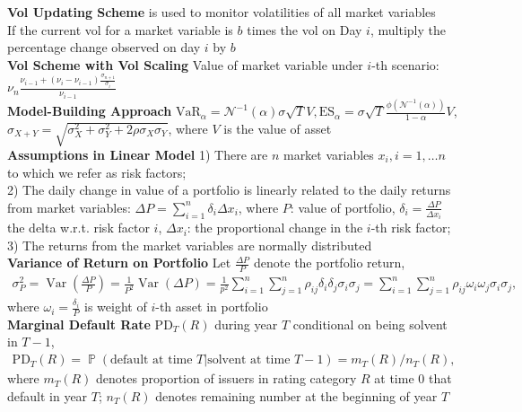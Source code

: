 \documentclass[12pt,landscape, a4paper]{article}
\theoremstyle{remark}
\newcommand{\var}{\operatorname{Var}}
\newcommand{\prob}{\operatorname{\mathbb{P}}}
\newcommand{\VaR}{\mathrm{VaR}}
\newcommand{\ES}{\mathrm{ES}}
\newcommand{\PD}{\mathrm{PD}}
\begin{document}
\begin{multicols*}{3}
\textbf{Vol Updating Scheme} is used to monitor volatilities of all market variables\\
If the current vol for a market variable is $b$ times the vol on Day $i$, multiply the percentage change observed on day $i$ by $b$
\\
\vspace{-5pt}
\textbf{Vol Scheme with Vol Scaling} Value of market variable under $i$-th scenario: $\nu_n \frac{\nu_{i-1} + (\nu_i - \nu_{i-1} ) \frac{\sigma_{n+1}}{\sigma_i}}{\nu_{i-1}}$\\
\vspace{-3pt}
\textbf{Model-Building Approach} $\VaR_\alpha = \mathcal{N}^{-1}(\alpha)\sigma \sqrt{T} V, \ES_\alpha = \sigma \sqrt{T} \frac{\phi(\mathcal{N}^{-1}(\alpha))}{1-\alpha}V$, $\sigma_{X+Y} = \sqrt{\sigma_X^2 + \sigma_Y^2 + 2\rho \sigma_X \sigma_Y}$, where $V$ is the value of asset\\

\textbf{Assumptions in Linear Model} 1) There are $n$ market variables $x_i, i = 1, \dots n$ to which we refer as risk factors; \\
2) The daily change in value of a portfolio is linearly related to the daily returns from market variables:
$\Delta P = \sum^n_{i=1} \delta_i \Delta x_i$, where $P$: value of portfolio, $\delta_i = \frac{\Delta P}{\Delta x_i}$  the delta w.r.t. risk factor $i$, $\Delta x_i$: the proportional change in the $i$-th risk factor;\\
3) The returns from the market variables are normally distributed\\

\textbf{Variance of Return on Portfolio} Let $\frac{\Delta P}{P}$ denote the portfolio return,
\begin{align*}
    \sigma_P^2 = \var \left(\frac{\Delta P}{P} \right) = \frac{1}{P^2} \var \left(\Delta P \right) = \frac{1}{p^2} \sum^n_{i=1} \sum^n_{j=1} \rho_{ij} \delta_i \delta_j \sigma_i \sigma_j = \sum^n_{i=1} \sum^n_{j=1} \rho_{ij} \omega_i \omega_j \sigma_i \sigma_j,
\end{align*}
where $\omega_i = \frac{\delta_i}{P}$ is weight of $i$-th asset in portfolio\\

\textbf{Marginal Default Rate} $\PD_T (R)$ during year $T$ conditional on being solvent in $T-1$,
\begin{align*}
    \PD_T (R) = \prob (\text{default at time } T \lvert \text{solvent at time }T-1) = m_T (R) / n_T (R),
\end{align*}
where $m_T (R)$ denotes proportion of issuers in rating category $R$ at time $0$ that default in year $T$; $n_T(R)$ denotes remaining number at the beginning of year $T$\\


\end{multicols*}
\end{document}
